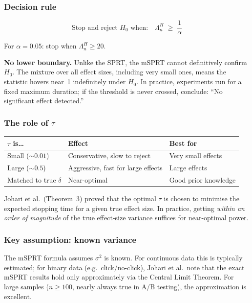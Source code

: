 \documentclass[12pt, a4paper]{article}
\newcommand{\LR}{\Lambda}              %
\begin{document}
\subsubsection*{Decision rule}

\[
  \text{Stop and reject } H_0 \text{ when:} \quad
  \boxed{\LR_n^{H} \;\geq\; \frac{1}{\alpha}}
\]

For $\alpha = 0.05$: stop when $\LR_n^{H} \geq 20$.

\textbf{No lower boundary.}
Unlike the SPRT, the mSPRT cannot definitively confirm $H_0$.  The mixture
over all effect sizes, including very small ones, means the statistic hovers
near~1 indefinitely under $H_0$.  In practice, experiments run for a fixed
maximum duration; if the threshold is never crossed, conclude: ``No significant
effect detected.''

\subsubsection*{The role of $\tau$}

\begin{center}
\begin{tabular}{@{} l l l @{}}
\toprule
$\tau$ is\ldots & \textbf{Effect} & \textbf{Best for} \\
\midrule
Small ($\sim\!0.01$) & Conservative, slow to reject & Very small effects \\
Large ($\sim\!0.5$)  & Aggressive, fast for large effects & Large effects \\
Matched to true $\delta$ & Near-optimal & Good prior knowledge \\
\bottomrule
\end{tabular}
\end{center}

Johari et al.\ (Theorem~3) proved that the optimal $\tau$ is chosen to
minimise the expected stopping time for a given true effect size.  In practice,
getting \emph{within an order of magnitude} of the true effect-size variance
suffices for near-optimal power.

\subsubsection*{Key assumption: known variance}

The mSPRT formula assumes $\sigma^2$ is known.  For continuous data this is
typically estimated; for binary data (e.g.\ click/no-click), Johari et al.\
note that the exact mSPRT results hold only approximately via the Central Limit
Theorem.  For large samples ($n \geq 100$, nearly always
true in A/B testing), the approximation is excellent.
\end{document}
